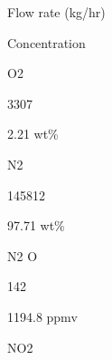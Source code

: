 \documentclass[a4paper,portrait,12pt]{article}
\begin{document}
\begin{flushleft}
Flow rate (kg/hr)
\end{flushleft}





\begin{flushleft}
Concentration
\end{flushleft}





\begin{flushleft}
O2
\end{flushleft}





3307





\begin{flushleft}
2.21 wt\%
\end{flushleft}





\begin{flushleft}
N2
\end{flushleft}





145812





\begin{flushleft}
97.71 wt\%
\end{flushleft}





\begin{flushleft}
N2 O
\end{flushleft}





142





\begin{flushleft}
1194.8 ppmv
\end{flushleft}





\begin{flushleft}
NO2
\end{flushleft}
\end{document}
